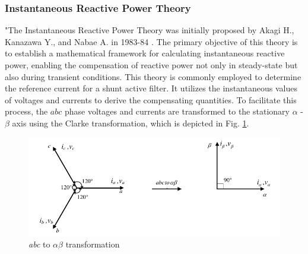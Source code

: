 \subsubsection{Instantaneous Reactive Power Theory \cite{Mahesh_Mishra}} 
\vspace*{-0.5cm}
"The Instantaneous Reactive Power Theory was initially proposed by Akagi H., Kanazawa Y., and Nabae A. in 1983-84 \cite{akagi1984instantaneous}. The primary objective of this theory is to establish a mathematical framework for calculating instantaneous reactive power, enabling the compensation of reactive power not only in steady-state but also during transient conditions. This theory is commonly employed to determine the reference current for a shunt active filter. It utilizes the instantaneous values of voltages and currents to derive the compensating quantities. To facilitate this process, the $abc$ phase voltages and currents are transformed to the stationary $\alpha$ - $\beta$ axis using the Clarke transformation, which is depicted in Fig. \ref{fig2.4a}.
\begin{figure}[ht]
	\centering
		\includegraphics[scale=1.1]{figures/Chapter_1_2/fig2p4a}
	\caption{\textit{abc} to $\alpha\beta$ transformation}
	\label{fig2.4a}
\end{figure}

